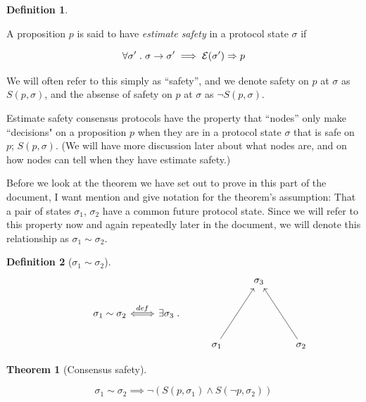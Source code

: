 \documentclass{article}
\theoremstyle{definition}
\newtheorem{thm}{Theorem}
\newtheorem{defn}{Definition}[section]
\begin{document}
\vspace{5mm}

\begin{defn}
\begin{description}
A proposition $p$ is said to have \emph{estimate safety} in a protocol state $\sigma$ if 

$$
\forall \sigma' \hspace{1mm}.\hspace{1mm} \sigma \to \sigma' \implies \mathcal{E}(\sigma') \Rightarrow p
$$
\end{description}
\end{defn}

We will often refer to this simply as ``safety'', and we denote safety on $p$ at $\sigma$ as $S(p,\sigma)$, and the absense of safety on $p$ at $\sigma$ as $\neg{S(p,\sigma)}$.

Estimate safety consensus protocols have the property that ``nodes'' only make ``decisions" on a proposition $p$ when they are in a protocol state $\sigma$ that is safe on $p$; $S(p,\sigma)$. (We will have more discussion later about what nodes are, and on how nodes can tell when they have estimate safety.)

Before we look at the theorem we have set out to prove in this part of the document, I want mention and give notation for the theorem's assumption: That a pair of states $\sigma_1$, $\sigma_2$ have a common future protocol state. Since we will refer to this property now and again repeatedly later in the document, we will denote this relationship as $\sigma_1 \sim \sigma_2$.

\begin{defn}[$\sigma_1 \sim \sigma_2$]
\begin{equation*}
\begin{tikzcd}
{}
  &
{}  
  &
{}  
  &
{}
  &
\sigma_3
  &
{}
  \\
{}
  &
\sigma_1 \sim \sigma_2
  \arrow[r,Leftrightarrow, "def"]
  &
\exists \sigma_3 \hspace{1mm}. 
  &
{}  
  &
{}
  &
{}
  \\
{}  
  &
{}  
  &
{}
  &
\sigma_1
  \arrow[uur,""]
  &
{}
  &
\sigma_2
  \arrow[uul,""]
\end{tikzcd}
\end{equation*}
\end{defn}

\begin{thm}[Consensus safety]
\begin{description}
$$
\sigma_1 \sim \sigma_2 \implies \neg(S(p,\sigma_1) \land S(\neg{p},\sigma_2))
$$
\end{description}
\end{thm}
\end{document}
